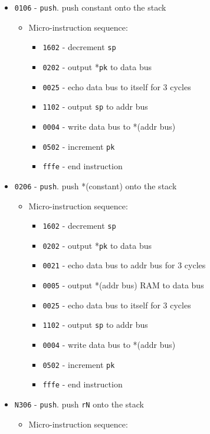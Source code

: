 \documentclass{article}
\def\pkptrout{\Verb|0202| - output *\Verb|pk| to data bus}
\def\sptoaddr{\Verb|1102| - output \Verb|sp| to addr bus}
\def\incrementpk{\Verb|0502| - increment \Verb|pk|}
\def\decrementsp{\Verb|1602| - decrement \Verb|sp|}
\def\regtodata#1{\Verb|#1003| - output \Verb|r#1| to data bus}
\def\writeRAM{\Verb|0004| - write data bus to *(addr bus)}
\def\readRAM{\Verb|0005| - output *(addr bus) RAM to data bus}
\def\echodataaddr{\Verb|0021| - echo data bus to addr bus for 3 cycles}
\def\echodatalong{\Verb|0025| - echo data bus to itself for 3 cycles}
\def\done{\Verb|fffe| - end instruction}
\begin{document}
\begin{itemize}
    \item \Verb|0106| - \Verb|push|. push constant onto the stack
    \begin{itemize}
        \item Micro-instruction sequence:
        \begin{itemize}
            \item \decrementsp
            \item \pkptrout
            \item \echodatalong
            \item \sptoaddr
            \item \writeRAM
            \item \incrementpk
            \item \done
        \end{itemize}
    \end{itemize}

    \item \Verb|0206| - \Verb|push|. push *(constant) onto the stack
    \begin{itemize}
        \item Micro-instruction sequence:
        \begin{itemize}
            \item \decrementsp
            \item \pkptrout
            \item \echodataaddr
            \item \readRAM
            \item \echodatalong
            \item \sptoaddr
            \item \writeRAM
            \item \incrementpk
            \item \done
        \end{itemize}
    \end{itemize}

    \item \Verb|N306| - \Verb|push|. push \Verb|rN| onto the stack
    \begin{itemize}
        \item Micro-instruction sequence:
    \end{itemize}


\end{itemize}
\end{document}
